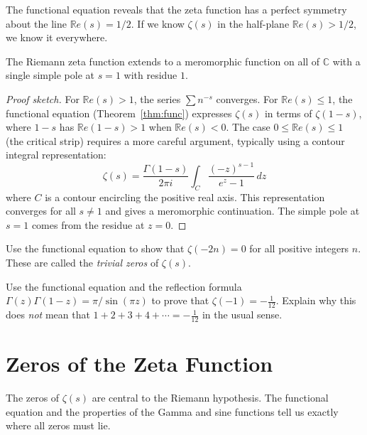 \begin{remark}
The functional equation reveals that the zeta function has a perfect symmetry about the line $\mathbb{R}e(s) = 1/2$. If we know $\zeta(s)$ in the half-plane $\mathbb{R}e(s) > 1/2$, we know it everywhere.
\end{remark}

\begin{theorem}
\label{thm:analytic}
The Riemann zeta function extends to a meromorphic function on all of $\mathbb{C}$ with a single simple pole at $s = 1$ with residue $1$.
\end{theorem}

\begin{proof}[Proof sketch]
For $\mathbb{R}e(s) > 1$, the series $\sum n^{-s}$ converges. For $\mathbb{R}e(s) \le 1$, the functional equation (Theorem~\ref{thm:func}) expresses $\zeta(s)$ in terms of $\zeta(1-s)$, where $1-s$ has $\mathbb{R}e(1-s) > 1$ when $\mathbb{R}e(s) < 0$. The case $0 \le \mathbb{R}e(s) \le 1$ (the critical strip) requires a more careful argument, typically using a contour integral representation:
\[
\zeta(s) = \frac{\Gamma(1-s)}{2\pi i} \int_C \frac{(-z)^{s-1}}{e^z - 1} \, dz
\]
where $C$ is a contour encircling the positive real axis. This representation converges for all $s \neq 1$ and gives a meromorphic continuation. The simple pole at $s = 1$ comes from the residue at $z = 0$.
\end{proof}

\begin{exercise}
\label{ex:zeta_neg_even}
Use the functional equation to show that $\zeta(-2n) = 0$ for all positive integers $n$. These are called the \textit{trivial zeros} of $\zeta(s)$.
\end{exercise}

\begin{exercise}
\label{ex:zeta_neg1}
Use the functional equation and the reflection formula $\Gamma(z)\Gamma(1-z) = \pi / \sin(\pi z)$ to prove that $\zeta(-1) = -\frac{1}{12}$. Explain why this does \emph{not} mean that $1 + 2 + 3 + 4 + \cdots = -\frac{1}{12}$ in the usual sense.
\end{exercise}

\section{Zeros of the Zeta Function}
\label{sec:zeros}

The zeros of $\zeta(s)$ are central to the Riemann hypothesis. The functional equation and the properties of the Gamma and sine functions tell us exactly where all zeros must lie.

